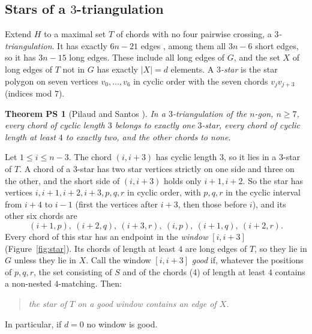 \documentclass[11pt]{amsart}
\newtheorem*{ps}{Theorem PS}
\theoremstyle{definition}\newtheorem{problem}{Problem}
\theoremstyle{remark}\newtheorem*{remark}{Remark}
\begin{document}
\subsection{Stars of a $3$-triangulation}
Extend $H$ to a maximal set $T$ of chords with no four pairwise crossing, a \emph{$3$-triangulation}. It has exactly
$6n-21$ edges \cite{CP,PS}, among them all $3n-6$ short edges, so it has $3n-15$ long edges. These include all long
edges of $G$, and the set $X$ of long edges of $T$ not in $G$ has exactly $|X|=d$ elements. A \emph{$3$-star} is the
star polygon on seven vertices $v_0,\dots,v_6$ in cyclic order with the seven chords $v_jv_{j+3}$ (indices mod $7$).

\begin{ps}[Pilaud and Santos {\cite[Theorem~1.4(2), Corollary~4.2]{PS}}]
In a $3$-triangulation of the $n$-gon, $n\ge7$, every chord of cyclic length $3$ belongs to exactly one $3$-star, every
chord of cyclic length at least $4$ to exactly two, and the other chords to none.
\end{ps}

Let $1\le i\le n-3$. The chord $(i,i+3)$ has cyclic length $3$, so it lies in a $3$-star of $T$. A chord of a $3$-star
has two star vertices strictly on one side and three on the other, and the short side of $(i,i+3)$ holds only
$i+1,i+2$. So the star has vertices $i,i+1,i+2,i+3,p,q,r$ in cyclic order, with $p,q,r$ in the cyclic interval from
$i+4$ to $i-1$ (first the vertices after $i+3$, then those before $i$), and its other six chords are
\[
(i+1,p),\ (i+2,q),\ (i+3,r),\ (i,p),\ (i+1,q),\ (i+2,r). \tag{4}
\]
Every chord of this star has an endpoint in the \emph{window} $[i,i+3]$ (Figure~\ref{fig:star}). Its chords of length
at least $4$ are long edges of $T$, so they lie in $G$ unless they lie in $X$. Call the window $[i,i+3]$ \emph{good} if,
whatever the positions of $p,q,r$, the set consisting of $S$ and of the chords (4) of length at least $4$ contains a
non-nested $4$-matching. Then:
\begin{quote}
\emph{the star of $T$ on a good window contains an edge of $X$.}
\end{quote}
In particular, if $d=0$ no window is good.
\end{document}
